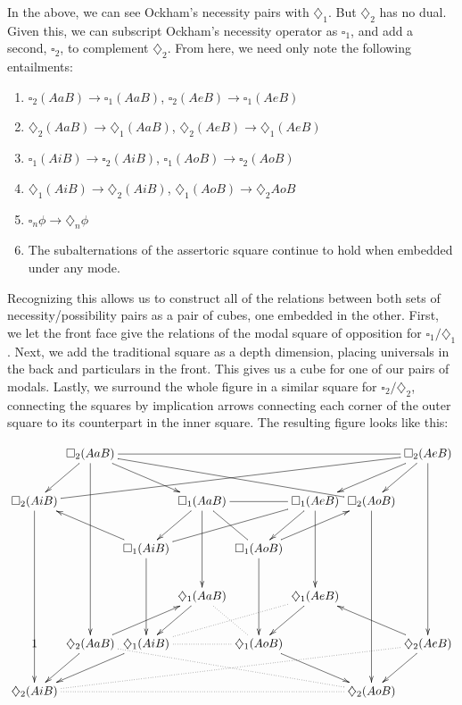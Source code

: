 \documentclass[]{article}
\begin{document}
In the above, we can see Ockham's necessity pairs with $\diamondsuit_{1}$. But $\diamondsuit_{2}$ has no dual. Given this, we can subscript Ockham's necessity operator as $\square_{1}$, and add a second, $\square_{2}$, to complement $\diamondsuit_{2}$. From here, we need only note the following entailments:
\begin{enumerate}
	\item $\square_{2}(AaB) \rightarrow \square_{1}(AaB)$, $\square_{2}(AeB) \rightarrow \square_{1}(AeB)$
	\item $\diamondsuit_{2}(AaB) \rightarrow \diamondsuit_{1}(AaB)$, $\diamondsuit_{2}(AeB) \rightarrow \diamondsuit_{1}(AeB)$
	\item $\square_{1}(AiB) \rightarrow \square_{2}(AiB)$, $\square_{1}(AoB) \rightarrow \square_{2}(AoB)$
	\item $\diamondsuit_{1}(AiB) \rightarrow \diamondsuit_{2}(AiB)$, $\diamondsuit_{1}(AoB) \rightarrow \diamondsuit_{2}AoB$ 
	\item $\square_{n}\phi \rightarrow \diamondsuit_{n}\phi$
	\item The subalternations of the assertoric square continue to hold when embedded under any mode. 
\end{enumerate}
\noindent Recognizing this allows us to construct all of the relations between both sets of necessity/possibility pairs as a pair of cubes, one embedded in the other. First, we let the front face give the relations of the modal square of opposition for $\square_{1}/\diamondsuit_{1}$. Next, we add the traditional square as a depth dimension, placing universals in the back and particulars in the front. This gives us a cube for one of our pairs of modals. Lastly, we surround the whole figure in a similar square for $\square_{2}/\diamondsuit_{2}$, connecting the squares by implication arrows connecting each corner of the outer square to its counterpart in the inner square. The resulting figure looks like this:

\begin{displaymath}
\xymatrix@C=.1em{
	& \square_{2}(AaB) \ar[dddd] \ar[drr] \ar [dl] \ar@{-}[rrrrrr] \ar@{-}[drrrrr] &  &  &  &  &  & \square_{2}(AeB) \ar[dddd] \ar[dl] \ar[dll]\\
	\square_{2}(AiB) \ar[dddd] \ar@{-}[urrrrrrr] &  &  & \square_{1}(AaB) \ar[dd] \ar[dl] \ar@{-}[rr] \ar@{-}[dr]
	&  & \square_{1}(AeB) \ar[dd] \ar[dl] \ar@{-}[dlll] & \square_{2}(AoB) \ar[dddd] &  \\
	&  & \square_{1}(AiB) \ar[dd] \ar[ull] &  & \square_{1}(AoB) \ar[dd] \ar[urr] &  &  &  \\
	&  &  & \diamondsuit_{1}(AaB) \ar[dl] \ar@{.}[dr] &  & \diamondsuit_{1}(AeB) \ar[dl] &  &  \\ 
	1 & \diamondsuit_{2}(AaB) \ar[dl] \ar[urr] \ar@{.}[drrrrr] & \diamondsuit_{1}(AiB) \ar[dll] \ar@{.}[rr] \ar@{.}[rrru]& & \diamondsuit_{1}(AoB) \ar[drr] &  &  & \diamondsuit_{2}(AeB) \ar[ull] \ar[dl] \\
	\diamondsuit_{2}(AiB) \ar@{.}[rrrrrr] \ar@{.}[rrrrrrru] &  &  &  &  &  & \diamondsuit_{2}(AoB) & }
\end{displaymath}
\end{document}
